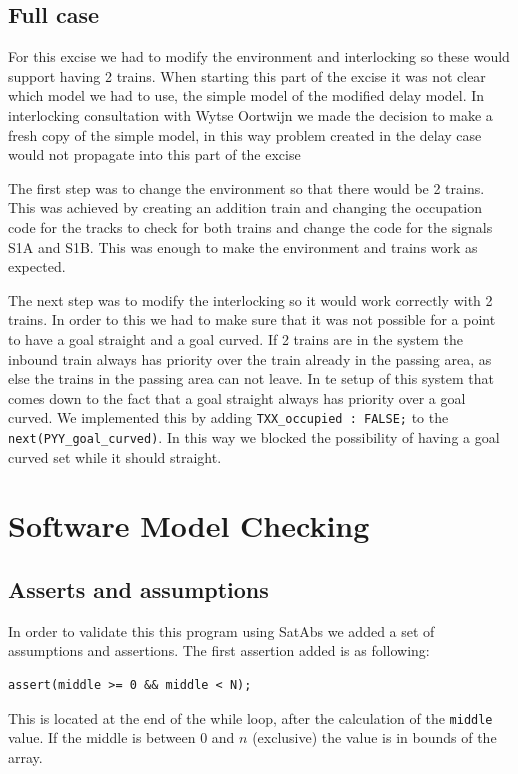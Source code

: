 \documentclass[a4paper]{article}
\begin{document}
	\subsection{Full case}
	For this excise we had to modify the environment and interlocking so these would support having 2 trains. When starting this part of the excise it was not clear which model we had to use, the simple model of the modified delay model. In interlocking consultation with Wytse Oortwijn we made the decision to make a fresh copy of the simple model, in this way problem created in the delay case would not propagate into this part of the excise 
	
	The first step was to change the environment so that there would be 2 trains. This was achieved by creating an addition train and changing the occupation code for the tracks to check for both trains and change the code for the signals S1A and S1B. This was enough to make the environment and trains work as expected.
	
	The next step was to modify the interlocking so it would work correctly with 2 trains.
	In  order to this we had to make sure that it was not possible for a point to have a goal straight and a goal curved. If 2 trains are in the system the inbound train always has priority over the train already in the passing area, as else the trains in the passing area can not leave. In te setup of this system that comes down to the fact that a goal straight always has priority over a goal curved. We implemented this by adding \texttt{TXX\_occupied : FALSE;} to the \texttt{next(PYY\_goal\_curved)}. In this way we blocked the possibility of having a goal curved set while it should straight.
	
	\section{Software Model Checking}
	
	
	\subsection{Asserts and assumptions}
	In order to validate this this program using SatAbs we added a set of assumptions and assertions.
	The first assertion added is as following:
	\begin{lstlisting}	
assert(middle >= 0 && middle < N);
	\end{lstlisting}
	This is located at the end of the while loop, after the calculation of the \texttt{middle} value. If the middle is between $0$ and $n$ (exclusive) the value is in bounds of the array.
	
\end{document}
